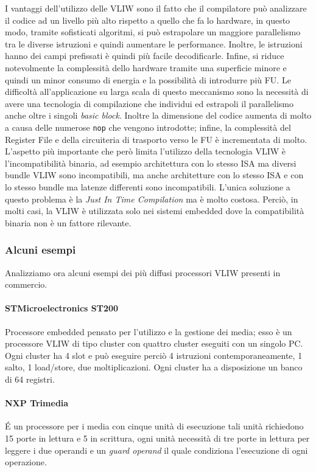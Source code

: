 I vantaggi dell'utilizzo delle VLIW sono il fatto che il compilatore può analizzare il codice ad un livello più alto rispetto a quello che fa lo hardware, in questo modo, tramite sofisticati algoritmi, si può estrapolare un maggiore parallelismo tra le diverse istruzioni e quindi aumentare le performance. Inoltre, le istruzioni hanno dei campi prefissati è quindi più facile decodificarle. Infine, si riduce notevolmente la complessità dello hardware tramite una superficie minore e quindi un minor consumo di energia e la possibilità di introdurre più FU. Le difficoltà all'applicazione su larga scala di questo meccanismo sono la necessità di avere una tecnologia di compilazione che individui ed estrapoli il parallelismo anche oltre i singoli \emph{basic block}. Inoltre la dimensione del codice aumenta di molto a causa delle numerose \texttt{nop} che vengono introdotte; infine, la complessità del Register File e della circuiteria di trasporto verso le FU è incrementata di molto. L'aspetto più importante che però limita l'utilizzo della tecnologia VLIW è l'incompatibilità binaria, ad esempio architettura con lo stesso ISA ma diversi bundle VLIW sono incompatibili, ma anche architetture con lo stesso ISA e con lo stesso bundle ma latenze differenti sono incompatibili. L'unica soluzione a questo problema è la \emph{Just In Time Compilation} ma è molto costosa. Perciò, in molti casi, la VLIW è utilizzata solo nei sistemi embedded dove la compatibilità binaria non è un fattore rilevante.
\subsubsection{Alcuni esempi}
Analizziamo ora alcuni esempi dei più diffusi processori VLIW presenti in commercio.
\paragraph{STMicroelectronics ST200}
Processore embedded pensato per l'utilizzo e la gestione dei media; esso è un processore VLIW di tipo cluster con quattro cluster eseguiti con un singolo PC. Ogni cluster ha 4 slot e può eseguire perciò 4 istruzioni contemporaneamente, 1 salto, 1 load/store, due moltiplicazioni. Ogni cluster ha a disposizione un banco di 64 registri.
\paragraph{NXP Trimedia}
\uppercase{é} un processore per i media con cinque unità di esecuzione tali unità richiedono 15 porte in lettura e 5 in scrittura, ogni unità necessità di tre porte in lettura per leggere i due operandi e un \emph{guard operand} il quale condiziona l'esecuzione di ogni operazione.
